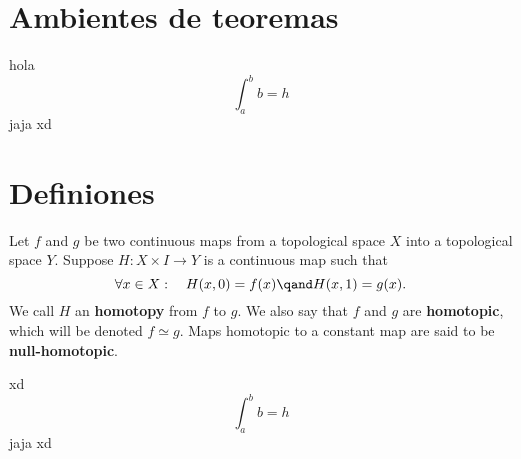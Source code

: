 \section{Ambientes de teoremas}

\lipsum[1]

\begin{theorem}
    hola \[\int_a^b b = h\]
    jaja xd
\end{theorem}


\section{Definiones}

\begin{definition}
    Let \(f\) and \(g\) be two continuous maps from a topological space \(X\) into a topological space \(Y\). Suppose \(H \colon X\times I \to Y\) is a continuous map such that 
    \[
        \forall x\in X :\quad H(x,0) = f(x) \qand H(x,1) = g(x).
    \]
    We call \(H\) an \textbf{homotopy} from \(f\) to \(g\). We also say that \(f\) and \(g\) are \textbf{homotopic}, which will be denoted \(f\simeq g\). Maps homotopic to a constant map are said to be \textbf{null-homotopic}.
\end{definition}


\lipsum[0]

\begin{theorem}
    xd \lipsum[1] \[\int_a^b b = h\]
    jaja xd
\end{theorem}



